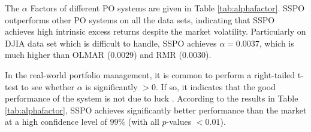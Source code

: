 \documentclass[twoside,11pt]{article}
\begin{document}
The $\alpha$ Factors of different PO systems are given in Table \ref{tab:alphafactor}. SSPO outperforms other PO systems on all the data sets, indicating that SSPO achieves high intrinsic excess returns despite the market volatility. Particularly on DJIA data set which is difficult to handle, SSPO achieves $\alpha=0.0037$, which is much higher than OLMAR ($0.0029$) and RMR ($0.0030$).

In the real-world portfolio management, it is common to perform a right-tailed t-test to see whether $\alpha$ is significantly $>0$. If so, it indicates that the good performance of the system is not due to luck \citep{activepm,OLMAR,RMR,RMR2}. According to the results in Table \ref{tab:alphafactor}, SSPO achieves significantly better performance than the market at a high confidence level of $99\%$ (with all $p$-values $<0.01$).
\end{document}
